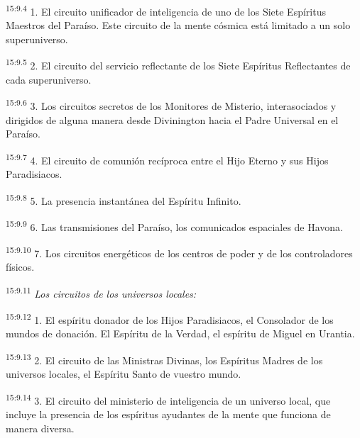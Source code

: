 \par
\textsuperscript{15:9.4} 1. El circuito unificador de inteligencia de uno de los Siete Espíritus Maestros del Paraíso. Este circuito de la mente cósmica está limitado a un solo superuniverso.

\par
\textsuperscript{15:9.5} 2. El circuito del servicio reflectante de los Siete Espíritus Reflectantes de cada superuniverso.

\par
\textsuperscript{15:9.6} 3. Los circuitos secretos de los Monitores de Misterio, interasociados y dirigidos de alguna manera desde Divinington hacia el Padre Universal en el Paraíso.

\par
\textsuperscript{15:9.7} 4. El circuito de comunión recíproca entre el Hijo Eterno y sus Hijos Paradisiacos.

\par
\textsuperscript{15:9.8} 5. La presencia instantánea del Espíritu Infinito.

\par
\textsuperscript{15:9.9} 6. Las transmisiones del Paraíso, los comunicados espaciales de Havona.

\par
\textsuperscript{15:9.10} 7. Los circuitos energéticos de los centros de poder y de los controladores físicos.

\par
\textsuperscript{15:9.11} \textit{Los circuitos de los universos locales:}

\par
\textsuperscript{15:9.12} 1. El espíritu donador de los Hijos Paradisiacos, el Consolador de los mundos de donación. El Espíritu de la Verdad, el espíritu de Miguel en Urantia.

\par
\textsuperscript{15:9.13} 2. El circuito de las Ministras Divinas, los Espíritus Madres de los universos locales, el Espíritu Santo de vuestro mundo.

\par
\textsuperscript{15:9.14} 3. El circuito del ministerio de inteligencia de un universo local, que incluye la presencia de los espíritus ayudantes de la mente que funciona de manera diversa.

